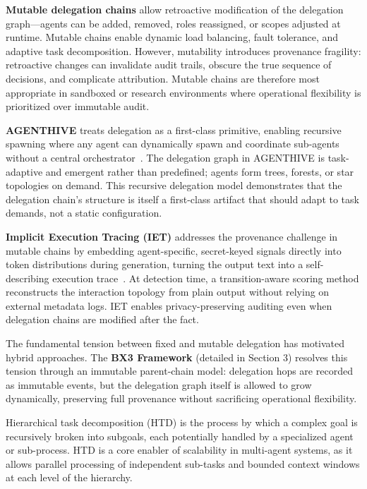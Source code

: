 \textbf{Mutable delegation chains} allow retroactive modification of the delegation graph---agents can be added, removed, roles reassigned, or scopes adjusted at runtime. Mutable chains enable dynamic load balancing, fault tolerance, and adaptive task decomposition. However, mutability introduces provenance fragility: retroactive changes can invalidate audit trails, obscure the true sequence of decisions, and complicate attribution. Mutable chains are therefore most appropriate in sandboxed or research environments where operational flexibility is prioritized over immutable audit.

\textbf{AGENTHIVE} treats delegation as a first-class primitive, enabling recursive spawning where any agent can dynamically spawn and coordinate sub-agents without a central orchestrator~\cite{openreview:iuZ5AIGmBm}. The delegation graph in AGENTHIVE is task-adaptive and emergent rather than predefined; agents form trees, forests, or star topologies on demand. This recursive delegation model demonstrates that the delegation chain's structure is itself a first-class artifact that should adapt to task demands, not a static configuration.

\textbf{Implicit Execution Tracing (IET)} addresses the provenance challenge in mutable chains by embedding agent-specific, secret-keyed signals directly into token distributions during generation, turning the output text into a self-describing execution trace~\cite{arxiv:2603.17445}. At detection time, a transition-aware scoring method reconstructs the interaction topology from plain output without relying on external metadata logs. IET enables privacy-preserving auditing even when delegation chains are modified after the fact.

The fundamental tension between fixed and mutable delegation has motivated hybrid approaches. The \textbf{BX3 Framework} (detailed in Section 3) resolves this tension through an immutable parent-chain model: delegation hops are recorded as immutable events, but the delegation graph itself is allowed to grow dynamically, preserving full provenance without sacrificing operational flexibility.


Hierarchical task decomposition (HTD) is the process by which a complex goal is recursively broken into subgoals, each potentially handled by a specialized agent or sub-process. HTD is a core enabler of scalability in multi-agent systems, as it allows parallel processing of independent sub-tasks and bounded context windows at each level of the hierarchy.

